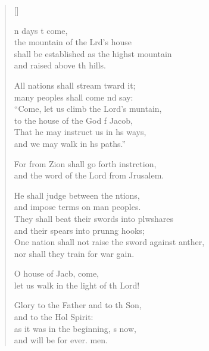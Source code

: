 \settowidth{\versewidth}{One nation shall not raise the sword against another, *}
\begin{verse}[\versewidth]
  \begin{patverse}
n days t come,\Med\\
the mountain of the Lrd’s house\\
shall be established as the highst mountain\Med\\
and raised above th hills.

All nations shall stream tward it;\Med\\
many peoples shall come nd say:\\
“Come, let us climb the Lord’s muntain,\Med\\
to the house of the God f Jacob,\\
That he may instruct us in h\pointup{\i}s ways, \Med\\
and we may walk in h\pointup{\i}s paths.”

For from Zion shall go forth instrction,\Med\\
and the word of the Lord from Jrusalem.

He shall judge between the ntions,\Med\\
and impose terms on man peoples.\\
They shall beat their swords into plwshares\Med\\
and their spears into prun\pointup{\i}ng hooks;\\
One nation shall not raise the sword against anther,\Med\\
nor shall they train for war gain.

O house of Jacb, come,\Med\\
let us walk in the light of th Lord!

Glory to the Father and to th Son,\Med\\
    and to the Hol Spirit:\\
as it was in the beginning, \pointup{\i}s now,\Med\\
    and will be for ever. men.
  \end{patverse}
\end{verse}
